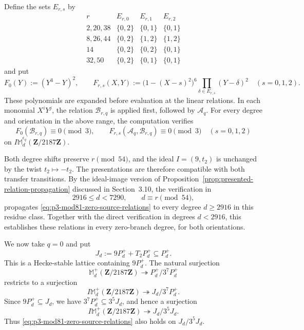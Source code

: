 \documentclass[11pt]{article}
\theoremstyle{plain}
\theoremstyle{definition}
\theoremstyle{remark}
\numberwithin{equation}{section}
\begin{document}
Define the sets \(E_{r,s}\) by
\[
\begin{array}{c|ccc}
r & E_{r,0} & E_{r,1} & E_{r,2}\\ \hline
2,20,38 & \{0,2\} & \{0,1\} & \{0,1\}\\
8,26,44 & \{0,2\} & \{1,2\} & \{1,2\}\\
14      & \{0,2\} & \{0,2\} & \{0,1\}\\
32,50   & \{0,2\} & \{0,1\} & \{0,1\}
\end{array}
\]
and put \[ F_0(Y):=(Y^3-Y)^2, \qquad F_{r,s}(X,Y):= \bigl(1-(X-s)^2\bigr)^6 \prod_{\delta\in E_{r,s}}(Y-\delta)^2 \quad(s=0,1,2). \] These polynomials are expanded before evaluation at the linear relations. In each monomial \(X^iY^j\), the relation \(\mathcal B_{r,q}\) is applied first, followed by \(\mathcal A_q\).  For every degree and orientation in the above range, the computation \cite[\href{https://github.com/nrustom/hecke-congruences/blob/main/playground_mod_81.ipynb}{\nolinkurl{playground_mod_81.ipynb}}] {RustomHeckeCongruences} verifies \begin{equation} F_0(\mathcal B_{r,q})\equiv0\pmod3, \qquad F_{r,s}(\mathcal A_q,\mathcal B_{r,q}) \equiv0\pmod3 \quad(s=0,1,2) \label{eq:p3-mod81-zero-source-relations} \end{equation} on \(I\mathbb M_d^{\epsilon_q}(\mathbf Z/2187\mathbf Z)\).

Both degree shifts preserve \(r\pmod{54}\), and the ideal \(I=(9,t_2)\) is unchanged by the twist \(t_2\mapsto-t_2\). The presentations are therefore compatible with both transfer transitions. By the ideal-image version of Proposition~\ref{prop:presented-relation-propagation} discussed in Section~3.10, the verification in \[ 2916\leq d<7290,\qquad d\equiv r\pmod{54}, \] propagates \eqref{eq:p3-mod81-zero-source-relations} to every degree \(d\geq2916\) in this residue class. Together with the direct verification in degrees \(d<2916\), this establishes these relations in every zero-branch degree, for both orientations.

We now take \(q=0\) and put \[ J_d:=9P_d^++T_2P_d^+\subseteq P_d^+. \] This is a Hecke-stable lattice containing \(9P_d^+\). The natural surjection \[ \mathbb M_d^+(\mathbf Z/2187\mathbf Z) \twoheadrightarrow P_d^+/3^7P_d^+ \] restricts to a surjection \[ I\mathbb M_d^+(\mathbf Z/2187\mathbf Z) \twoheadrightarrow J_d/3^7P_d^+. \] Since \(9P_d^+\subseteq J_d\), we have \(3^7P_d^+\subseteq3^5J_d\), and hence a surjection \[ I\mathbb M_d^+(\mathbf Z/2187\mathbf Z) \twoheadrightarrow J_d/3^5J_d. \] Thus \eqref{eq:p3-mod81-zero-source-relations} also holds on \(J_d/3^5J_d\).
\end{document}

